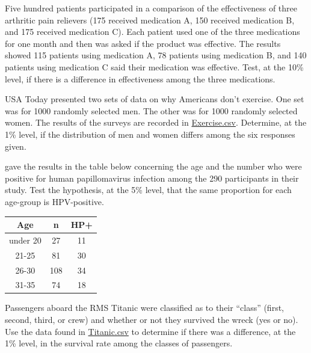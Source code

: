 \documentclass[10pt,openany]{book}\usepackage[]{graphicx}\usepackage[]{color}
\begin{document}
\begin{exsection}
  \item \label{revex:ChiArthritis} \rhw{} Five hundred patients participated in a comparison of the effectiveness of three arthritic pain relievers (175 received medication A, 150 received medication B, and 175 received medication C).  Each patient used one of the three medications for one month and then was asked if the product was effective.  The results showed 115 patients using medication A, 78 patients using medication B, and 140 patients using medication C said their medication was effective.  Test, at the 10\% level, if there is a difference in effectiveness among the three medications. 

  \item \label{revex:ChiExer} \rhw{} USA Today presented two sets of data on why Americans don't exercise.  One set was for 1000 randomly selected men.  The other was for 1000 randomly selected women.  The results of the surveys are recorded in \href{https://raw.githubusercontent.com/droglenc/NCData/master/Exercise.csv}{Exercise.csv}.  Determine, at the 1\% level, if the distribution of men and women differs among the six responses given. 

  \item \label{revex:ChiHPV} \rhw{} \cite{Fairleyetal1994} gave the results in the table below concerning the age and the number who were positive for human papillomavirus infection among the 290 participants in their study.  Test the hypothesis, at the 5\% level, that the same proportion for each age-group is HPV-positive. 
  \begin{center}
    \begin{tabular}{ccc}
      \hline\hline
      Age & n & HP+ \\
      \hline
      under 20 & 27 & 11 \\
      21-25 & 81 & 30 \\
      26-30 & 108 & 34 \\
      31-35 & 74 & 18 \\
      \hline\hline
    \end{tabular}
  \end{center}

  \item \label{revex:chiTitanic} \rhw{} Passengers aboard the RMS Titanic were classified as to their ``class'' (first, second, third, or crew) and whether or not they survived the wreck (yes or no).  Use the data found in \href{https://raw.githubusercontent.com/droglenc/NCData/master/Titanic.csv}{Titanic.csv} to determine if there was a difference, at the 1\% level, in the survival rate among the classes of passengers. 


\end{exsection}
\end{document}
